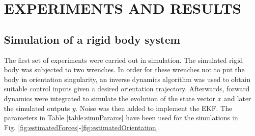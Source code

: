 \documentclass[letterpaper, 10 pt, conference]{ieeeconf}  %
\begin{document}
\section{EXPERIMENTS AND RESULTS}
\label{section:experiments}


\subsection{Simulation of a rigid body system}

The first set of experiments were carried out in simulation. The simulated rigid body was subjected to two wrenches. In order for these wrenches not to put the body in orientation singularity, an inverse dynamics algorithm was used to obtain suitable control inputs given a desired orientation trajectory. Afterwards, forward dynamics were integrated to simulate the evolution of the state vector $x$ and later the simulated outputs $y$. Noise was then added to implement the EKF. The parameters in Table \ref{table:simuParams} have been used for the simulations in Fig. \ref{fig:estimatedForces}-\ref{fig:estimatedOrientation}.
\end{document}

